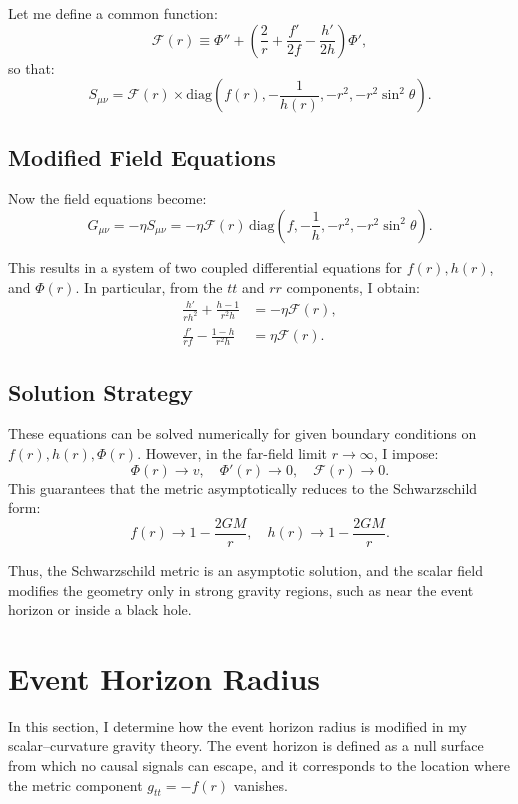 \documentclass[12pt]{article}
\begin{document}
Let me define a common function:
\[
\mathcal{F}(r) \equiv \Phi'' + \left( \frac{2}{r} + \frac{f'}{2f} - \frac{h'}{2h} \right) \Phi',
\]
so that:
\[
S_{\mu\nu} = \mathcal{F}(r) \times \text{diag} \left( f(r), -\frac{1}{h(r)}, -r^2, -r^2 \sin^2 \theta \right).
\]

\subsection{Modified Field Equations}

Now the field equations become:
\[
G_{\mu\nu} = -\eta S_{\mu\nu} = -\eta \mathcal{F}(r) \, \text{diag} \left( f, -\frac{1}{h}, -r^2, -r^2 \sin^2 \theta \right).
\]

This results in a system of two coupled differential equations for \( f(r), h(r) \), and \( \Phi(r) \). In particular, from the \( tt \) and \( rr \) components, I obtain:
\begin{align}
\frac{h'}{r h^2} + \frac{h - 1}{r^2 h} &= -\eta \mathcal{F}(r), \\
\frac{f'}{r f} - \frac{1 - h}{r^2 h} &= \eta \mathcal{F}(r).
\end{align}

\subsection{Solution Strategy}

These equations can be solved numerically for given boundary conditions on \( f(r), h(r), \Phi(r) \). However, in the far-field limit \( r \to \infty \), I impose:
\[
\Phi(r) \to v, \quad \Phi'(r) \to 0, \quad \mathcal{F}(r) \to 0.
\]
This guarantees that the metric asymptotically reduces to the Schwarzschild form:
\[
f(r) \to 1 - \frac{2GM}{r}, \quad h(r) \to 1 - \frac{2GM}{r}.
\]

Thus, the Schwarzschild metric is an asymptotic solution, and the scalar field modifies the geometry only in strong gravity regions, such as near the event horizon or inside a black hole.

\section{Event Horizon Radius}

In this section, I determine how the event horizon radius is modified in my scalar--curvature gravity theory. The event horizon is defined as a null surface from which no causal signals can escape, and it corresponds to the location where the metric component \( g_{tt} = -f(r) \) vanishes.
\end{document}
